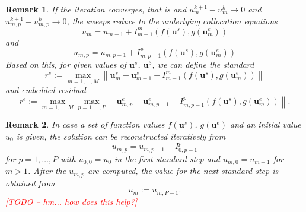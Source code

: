 \documentclass{article}
\newtheorem{remark}{Remark}
\newcommand{\ve}[1]{\mathbf{#1}}
\newcommand{\todo}[1]{\textcolor{red}{[TODO -- #1]}}
\begin{document}
\begin{remark}
If the iteration converges, that is and $u^{k+1}_{m} - u^{k}_{m} \to 0$ and $u^{k+1}_{m,p} - u^{k}_{m,p} \to 0$, the sweeps reduce to the underlying collocation equations
\begin{equation}
	u_{m} = u_{m-1} + I_{m-1}^{m} \left( f(\ve{u}^{s}) , g(\ve{u}^{e}_m) \right)
\end{equation}
and
\begin{equation}
	u_{m,p} = u_{m,p-1} + I_{m,p-1}^{p} \left( f(\ve{u}^{s}) , g(\ve{u}^{e}_m) \right)
\end{equation}
Based on this, for given values of $\ve{u}^s$, $\ve{u}^3$, we can define the standard 
\begin{equation}
 r^s := \max_{m=1,\ldots,M} \left\| \ve{u}^s_{m} - \ve{u}^s_{m-1} - I_{m-1}^{m}\left( f(\ve{u}^{s}) , g(\ve{u}^{e}_m) \right) \right\|
\end{equation}
and embedded residual
\begin{equation}
	r^e := \max_{m=1,\ldots,M} \max_{p=1,\ldots,P} \left\| \ve{u}^e_{m,p} - \ve{u}^e_{m,p-1} - I_{m,p-1}^{p}\left( f(\ve{u}^{s}) , g(\ve{u}^{e}_m) \right) \right\|.
\end{equation}
\end{remark}
%
%
%
\begin{remark}
In case a set of function values $f(\ve{u}^{s})$, $g(\ve{u}^e)$ and an initial value $u_0$ is given, the solution can be reconstructed iteratively from
\begin{equation}
	u_{m,p} = u_{m,p-1} + I_{0,p-1}^{p}
\end{equation}
for $p=1, \ldots, P$ with $u_{0,0} = u_0$ in the first standard step and $u_{m,0} = u_{m-1}$ for $m > 1$.
After the $u_{m,p}$ are computed, the value for the next standard step is obtained from
\begin{equation}
	u_{m} := u_{m,P-1}.
\end{equation}
\todo{hm... how does this help?}
\end{remark}
%
%
%
\end{document}
